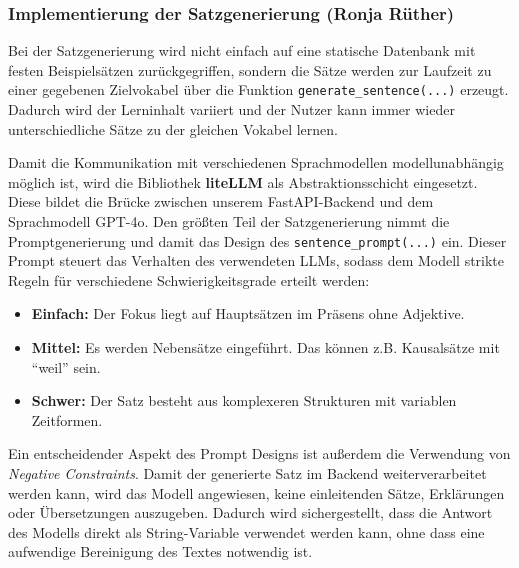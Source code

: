 \subsubsection{Implementierung der Satzgenerierung (Ronja Rüther)}
\label{implementierung_satzgenerierung}
Bei der Satzgenerierung wird nicht einfach auf eine statische Datenbank mit festen Beispielsätzen zurückgegriffen, sondern die Sätze werden zur Laufzeit zu einer gegebenen Zielvokabel über die
Funktion \texttt{generate\_sentence(...)} erzeugt. Dadurch wird der Lerninhalt variiert und der Nutzer kann immer wieder unterschiedliche Sätze zu der gleichen Vokabel lernen.

Damit die Kommunikation mit verschiedenen Sprachmodellen modellunabhängig möglich ist, wird die Bibliothek \textbf{liteLLM} als Abstraktionsschicht eingesetzt. Diese bildet die Brücke zwischen unserem 
FastAPI-Backend und dem Sprachmodell GPT-4o. 
Den größten Teil der Satzgenerierung nimmt die Promptgenerierung und damit das Design des \texttt{sentence\_prompt(...)} ein. 
Dieser Prompt steuert das Verhalten des verwendeten LLMs, sodass dem Modell strikte Regeln für verschiedene Schwierigkeitsgrade erteilt werden:
\begin{itemize}
    \item \textbf{Einfach:} Der Fokus liegt auf Hauptsätzen im Präsens ohne Adjektive.
    \item \textbf{Mittel:} Es werden Nebensätze eingeführt. Das können z.B. Kausalsätze mit \enquote{weil} sein.
    \item \textbf{Schwer:} Der Satz besteht aus komplexeren Strukturen mit variablen Zeitformen.
\end{itemize}

Ein entscheidender Aspekt des Prompt Designs ist außerdem die Verwendung von \textit{Negative Constraints}. 
Damit der generierte Satz im Backend weiterverarbeitet werden kann, wird das Modell angewiesen, keine einleitenden Sätze, Erklärungen oder Übersetzungen auszugeben.
Dadurch wird sichergestellt, dass die Antwort des Modells direkt als String-Variable verwendet werden kann, ohne dass eine aufwendige Bereinigung des Textes notwendig ist. 

